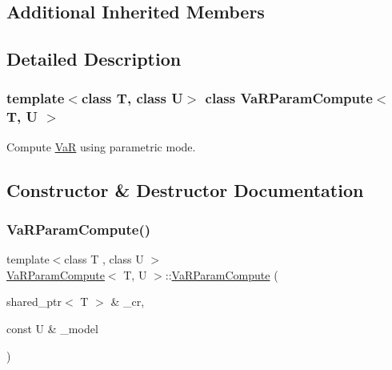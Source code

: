 \subsection*{Additional Inherited Members}


\subsection{Detailed Description}
\subsubsection*{template$<$class T, class U$>$\newline
class Va\+R\+Param\+Compute$<$ T, U $>$}

Compute \hyperlink{classVaR}{VaR} using parametric mode. 

\subsection{Constructor \& Destructor Documentation}
\hypertarget{classVaRParamCompute_a43e231d21477bb07cb41f39996d5a993}{}\label{classVaRParamCompute_a43e231d21477bb07cb41f39996d5a993} 
\subsubsection{\texorpdfstring{Va\+R\+Param\+Compute()}{VaRParamCompute()}}
{\footnotesize\ttfamily template$<$class T , class U $>$ \\
\hyperlink{classVaRParamCompute}{Va\+R\+Param\+Compute}$<$ T, U $>$\+::\hyperlink{classVaRParamCompute}{Va\+R\+Param\+Compute} (\begin{DoxyParamCaption}\item[{shared\+\_\+ptr$<$ T $>$ \&}]{\+\_\+cr,  }\item[{const U \&}]{\+\_\+model }\end{DoxyParamCaption})\hspace{0.3cm}{\ttfamily [inline]}}

\hypertarget{classVaRParamCompute_ac1c0c92954f1a6951d9355dccfa7ebcd}{}\label{classVaRParamCompute_ac1c0c92954f1a6951d9355dccfa7ebcd} 
